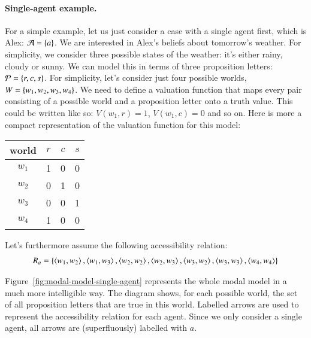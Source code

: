 \documentclass[nobib,nofonts]{tufte-handout}
\begin{document}
\paragraph{Single-agent example.}
For a simple example, let us just consider a case with a single agent first, which is Alex: $\mathcal{A} = \left\{a\right\}$.
We are interested in Alex's beliefs about tomorrow's weather.
For simplicity, we consider three possible states of the weather: it's either rainy, cloudy or sunny.
We can model this in terms of three proposition letters: $\mathcal{P} = \left\{r, c, s\right\}$.
For simplicity, let's consider just four possible worlds, $W = \left\{w_{1}, w_{2}, w_{3}, w_{4}\right\}$.
We need to define a valuation function that maps every pair consisting of a possible world and a proposition letter onto a truth value.
This could be written like so: $V(w_{1},r) = 1$, $V(w_{1},c) = 0$ and so on.
Here is more a compact representation of the valuation function for this model:
\begin{center}
  \begin{tabular}{cccc}
    world & $r$ & $c$ & $s$ \\ \hline
    $w_{1}$ & 1 & 0 & 0 \\
    $w_{2}$ & 0 & 1 & 0 \\
    $w_{3}$ & 0 & 0 & 1 \\
    $w_{4}$ & 1 & 0 & 0 \\
  \end{tabular}
\end{center}
Let's furthermore assume the following accessibility relation:
\begin{align*}
  R_{a} = \left\{
  \left \langle w_{1}, w_{2}\right\rangle, \left \langle w_{1}, w_{3}\right\rangle,
  \left \langle w_{2}, w_{2}\right\rangle, \left \langle w_{2}, w_{3}\right\rangle,
  \left \langle w_{3}, w_{2}\right\rangle, \left \langle w_{3}, w_{3}\right\rangle,
  \left \langle w_{4}, w_{4}\right\rangle
  \right\}
\end{align*}

Figure~\ref{fig:modal-model-single-agent} represents the whole modal model in a much more intelligible way.
The diagram shows, for each possible world, the set of all proposition letters that are true in this world.
Labelled arrows are used to represent the accessibility relation for each agent.
Since we only consider a single agent, all arrows are (superfluously) labelled with $a$.
\end{document}
